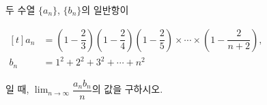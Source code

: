 두 수열 $\{a_n\}$, $\{b_n\}$의 일반항이 \par\smallskip\noindent\hspace*{1.5em}$\begin{aligned}[t] a_n&=\left(1-\dfrac{2}{3}\right)\left(1-\dfrac{2}{4}\right)\left(1-\dfrac{2}{5}\right)\times\cdots\times\left(1-\dfrac{2}{n+2}\right),\\ b_n&=1^2+2^2+3^2+\cdots+n^2 \end{aligned}$\par\smallskip\noindent 일 때, $\displaystyle\lim_{n\to\infty}\dfrac{a_nb_n}{n}$의 값을 구하시오.
